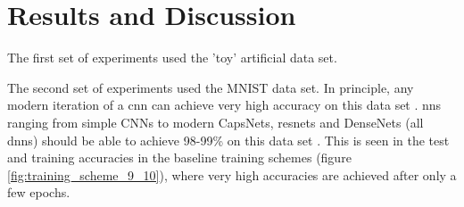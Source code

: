 \chapter{Results and Discussion}

The first set of experiments used the 'toy' artificial data set. \bigskip

The second set of experiments used the MNIST data set. In principle, any modern iteration of a \gls{cnn} can achieve very high accuracy on this data set \cite{mnist_sota_web}. \gls{nn}s ranging from simple CNNs to modern CapsNets, \gls{resnet}s and DenseNets (all \gls{dnn}s) should be able to achieve 98-99\% on this data set {\cite{mnist_sota_web}}. This is seen in the test and training accuracies in the baseline training schemes (figure \ref{fig:training_scheme_9_10}), where very high accuracies are achieved after only a few \gls{epoch}s. 
\bigskip




